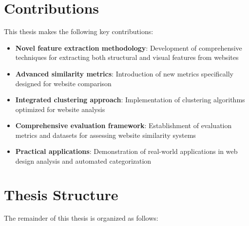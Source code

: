 \section{Contributions}
\label{sec:contributions}

This thesis makes the following key contributions:

\begin{itemize}
    \item \textbf{Novel feature extraction methodology}: Development of comprehensive techniques for extracting both structural and visual features from websites
    \item \textbf{Advanced similarity metrics}: Introduction of new metrics specifically designed for website comparison
    \item \textbf{Integrated clustering approach}: Implementation of clustering algorithms optimized for website analysis
    \item \textbf{Comprehensive evaluation framework}: Establishment of evaluation metrics and datasets for assessing website similarity systems
    \item \textbf{Practical applications}: Demonstration of real-world applications in web design analysis and automated categorization
\end{itemize}

\section{Thesis Structure}
\label{sec:thesis-structure}

The remainder of this thesis is organized as follows:


